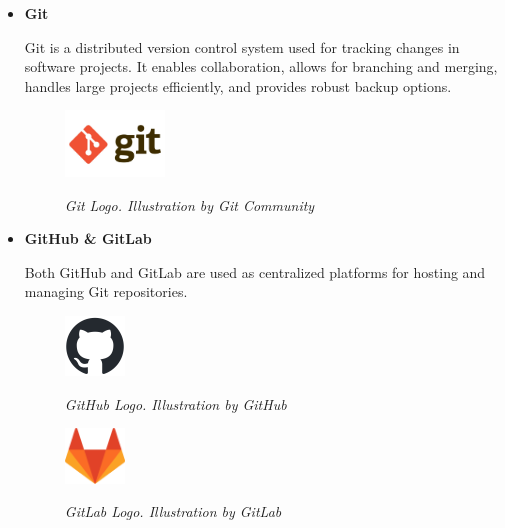 \begin{itemize}
  \item \textbf{Git}

    Git  is a distributed version control
    system used for tracking changes in software projects. It enables
    collaboration, allows for branching and merging, handles large projects
    efficiently, and provides robust backup options.

    \begin{figure}[H]
      \centering
      \begin{adjustbox}{trim=0cm 0.25cm, clip}
        \includegraphics[width=0.25\textwidth]{imatges/studies_and_decisions/git-logo.jpg}
      \end{adjustbox}
      \caption[Git Logo]{\textit{Git Logo. Illustration by Git Community}}
      {\label{fig:git-logo}}
    \end{figure}

  \item \textbf{GitHub \& GitLab}

    Both GitHub and GitLab are used as centralized platforms for hosting and
    managing Git repositories.

    \begin{figure}[H]
      \centering
      \begin{adjustbox}{trim=0cm 0cm, clip}
        \includegraphics[width=0.15\textwidth]{imatges/studies_and_decisions/github-mark.png}
      \end{adjustbox}
      \caption[GitHub Logo]{\textit{GitHub Logo. Illustration by GitHub}}
      {\label{fig:github-logo}}
    \end{figure}

    \begin{figure}[H]
      \centering
      \begin{adjustbox}{trim=0cm 0cm, clip}
        \includegraphics[width=0.15\textwidth]{imatges/studies_and_decisions/gitlab-logo.png}
      \end{adjustbox}
      \caption[GitLab Logo]{\textit{GitLab Logo. Illustration by GitLab}}
      {\label{fig:gitlab-logo}}
    \end{figure}


\end{itemize}
